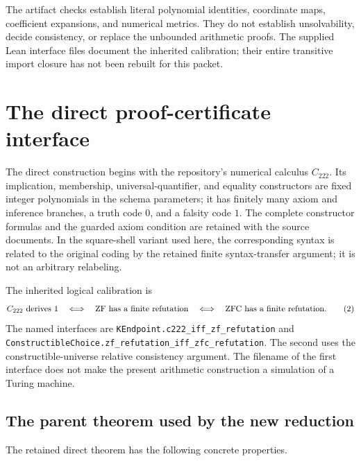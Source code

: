 \documentclass[11pt]{article}
\newcommand{\Ccal}{C_{222}}\newcommand{\htop}{\operatorname{ht}}
\newcommand{\file}[1]{\nolinkurl{#1}}
\theoremstyle{definition}\newtheorem{definition}[theorem]{Definition}
\theoremstyle{remark}\newtheorem{remark}[theorem]{Remark}
\begin{document}
The artifact checks establish literal polynomial identities, coordinate maps,
coefficient expansions, and numerical metrics. They do not establish
unsolvability, decide consistency, or replace the unbounded arithmetic proofs.
The supplied Lean interface files document the inherited calibration; their
entire transitive import closure has not been rebuilt for this packet.

\section{The direct proof-certificate interface}
\label{sec:interface}

The direct construction begins with the repository's numerical calculus
$\Ccal$. Its implication, membership, universal-quantifier, and equality
constructors are fixed integer polynomials in the schema parameters; it has
finitely many axiom and inference branches, a truth code $0$, and a falsity
code $1$. The complete constructor formulas and the guarded axiom condition
are retained with the source documents. In the square-shell variant used
here, the corresponding syntax is related to the original coding by the
retained finite syntax-transfer argument; it is not an arbitrary relabeling.

The inherited logical calibration is
\[
 \Ccal\text{ derives }1
 \quad\Longleftrightarrow\quad
 \mathrm{ZF}\text{ has a finite refutation}
 \quad\Longleftrightarrow\quad
 \ZFC\text{ has a finite refutation}.
 \tag{2}\label{eq:calibration}
\]
The named interfaces are
\file{KEndpoint.c222_iff_zf_refutation} and
\file{ConstructibleChoice.zf_refutation_iff_zfc_refutation}.
The second uses the constructible-universe relative consistency argument.
The filename of the first interface does not make the present arithmetic
construction a simulation of a Turing machine.

\subsection{The parent theorem used by the new reduction}
The retained direct theorem has the following concrete properties.
\end{document}
